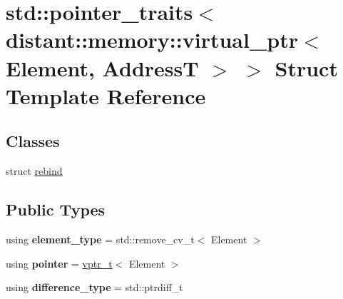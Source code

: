 \hypertarget{structstd_1_1pointer__traits_3_01distant_1_1memory_1_1virtual__ptr_3_01_element_00_01_address_t_01_4_01_4}{}\section{std\+:\+:pointer\+\_\+traits$<$ distant\+:\+:memory\+:\+:virtual\+\_\+ptr$<$ Element, AddressT $>$ $>$ Struct Template Reference}
\label{structstd_1_1pointer__traits_3_01distant_1_1memory_1_1virtual__ptr_3_01_element_00_01_address_t_01_4_01_4}
\subsection*{Classes}
\begin{DoxyCompactItemize}
\item 
struct \mbox{\hyperlink{structstd_1_1pointer__traits_3_01distant_1_1memory_1_1virtual__ptr_3_01_element_00_01_address_t_01_4_01_4_1_1rebind}{rebind}}
\end{DoxyCompactItemize}
\subsection*{Public Types}
\begin{DoxyCompactItemize}
\item 
\mbox{\label{structstd_1_1pointer__traits_3_01distant_1_1memory_1_1virtual__ptr_3_01_element_00_01_address_t_01_4_01_4_aae4043c377c927cc41710ef77db00698}} 
using {\bfseries element\+\_\+type} = std\+::remove\+\_\+cv\+\_\+t$<$ Element $>$
\item 
\mbox{\label{structstd_1_1pointer__traits_3_01distant_1_1memory_1_1virtual__ptr_3_01_element_00_01_address_t_01_4_01_4_a32bc109eb1d018fc9fc56f9982c5b3a8}} 
using {\bfseries pointer} = \mbox{\hyperlink{classdistant_1_1memory_1_1virtual__ptr}{vptr\+\_\+t}}$<$ Element $>$
\item 
\mbox{\label{structstd_1_1pointer__traits_3_01distant_1_1memory_1_1virtual__ptr_3_01_element_00_01_address_t_01_4_01_4_ae5467bd0b8411fcff5399b43b1ded9aa}} 
using {\bfseries difference\+\_\+type} = std\+::ptrdiff\+\_\+t
\end{DoxyCompactItemize}
